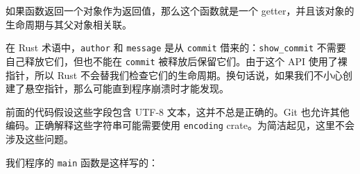 \begin{myNote}
如果函数返回一个对象作为返回值，那么这个函数就是一个 getter，并且该对象的生命周期与其父对象相关联。
\end{myNote}

在 Rust 术语中，\texttt{author} 和 \texttt{message} 是从 \texttt{commit} 借来的：\texttt{show\_commit} 不需要自己释放它们，但也不能在 \texttt{commit} 被释放后保留它们。由于这个 API 使用了裸指针，所以 Rust 不会替我们检查它们的生命周期。换句话说，如果我们不小心创建了悬空指针，那么可能直到程序崩溃时才能发现。

前面的代码假设这些字段包含 UTF-8 文本，这并不总是正确的。Git 也允许其他编码。正确解释这些字符串可能需要使用 \texttt{encoding} crate。为简洁起见，这里不会涉及这些问题。

我们程序的 \texttt{main} 函数是这样写的：

